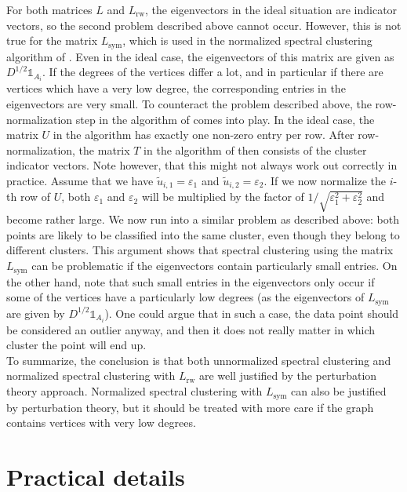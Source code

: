 \documentclass{article}
\newcommand{\eps}{\ensuremath{\varepsilon}}
\newcommand{\charfct}{\mathbb{1}}
\newcommand{\Lun}{L}
\newcommand{\Lsym}{L_{\text{sym}}}
\newcommand{\Lrw}{L_{\text{rw}}}
\begin{document}
For both matrices $\Lun$ and $\Lrw$, the eigenvectors in the ideal
situation are indicator vectors, so the second problem described above
cannot occur.  However, this is not true for the matrix $\Lsym$, which
is used in the normalized spectral clustering algorithm of
.  Even in the ideal case, the eigenvectors of this
matrix are given as $D^{1/2}\charfct_{A_i}$.  If the degrees of the
vertices differ a lot, and in particular if there are vertices which
have a very low degree, the corresponding entries in the eigenvectors
are very small.  To counteract the problem described above, the
row-normalization step in the algorithm of  comes into
play. In the ideal case, the matrix $U$ in the algorithm has exactly
one non-zero entry per row. After row-normalization, the matrix $T$ in
the algorithm of  then
consists of the cluster indicator vectors. Note however, that this might not always work out correctly in practice.  Assume that we have $\tilde
u_{i,1} = \eps_1$ and $\tilde u_{i,2} = \eps_2$.  If we now normalize
the $i$-th row of $U$, both $\eps_1$ and $\eps_2$ will be multiplied
by the factor of $1/\sqrt{\eps_1^2 + \eps_2^2}$ and become rather
large.  
We now run into a similar problem as described
above: both points are likely to be classified into the same cluster,
even though they belong to different clusters. 
%
This argument shows that spectral clustering using the matrix $\Lsym$
can be problematic if the eigenvectors contain particularly small
entries. On the other hand, note that such small entries in the eigenvectors
only occur if some of the vertices have a particularly low degrees (as
the eigenvectors of $\Lsym$ are given by $D^{1/2}\charfct_{A_i}$). One
could argue that in such a case, the data point should be considered
an outlier anyway, and then it does not really matter in which cluster the point will end up. \\

To summarize, the conclusion is that both unnormalized spectral clustering and
normalized spectral clustering with $\Lrw$ are well justified by the
perturbation theory approach. Normalized spectral clustering with
$\Lsym$ can also be justified by perturbation theory, but it should be
treated with more care if the graph contains vertices with
very low degrees. \\



%
\section{Practical details} \label{sec-inpractice}
%
\end{document}
